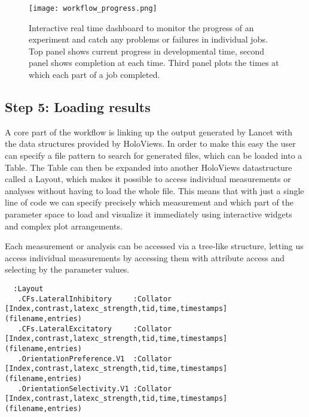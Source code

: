 \begin{figure}
	\centering
        \texttt{[image: workflow\_progress.png]}
	    \caption[Interactive dashboard to monitor workflow
          progress.]{Interactive real time dashboard to monitor the
          progress of an experiment and catch any problems or failures
          in individual jobs. Top panel shows current progress in
          developmental time, second panel shows completion at each
          time. Third panel plots the times at which each part of a
          job completed.}
	\label{workflow_progress}
\end{figure}


\subsection{Step 5: Loading results}

A core part of the workflow is linking up the output generated by
Lancet with the data structures provided by HoloViews. In order to
make this easy the user can specify a file pattern to search for
generated files, which can be loaded into a Table. The Table can then
be expanded into another HoloViews datastructure called a Layout,
which makes it possible to access individual measurements or analyses
without having to load the whole file. This means that with just a
single line of code we can specify precisely which measurement and
which part of the parameter space to load and visualize it immediately
using interactive widgets and complex plot arrangements.

Each measurement or analysis can be accessed via a tree-like
structure, letting us access individual measurements by accessing them
with attribute access and selecting by the parameter values.

\begin{minipage}{\linewidth}
\begin{lstlisting}
  :Layout
   .CFs.LateralInhibitory     :Collator   [Index,contrast,latexc_strength,tid,time,timestamps]   (filename,entries)
   .CFs.LateralExcitatory     :Collator   [Index,contrast,latexc_strength,tid,time,timestamps]   (filename,entries)
   .OrientationPreference.V1  :Collator   [Index,contrast,latexc_strength,tid,time,timestamps]   (filename,entries)
   .OrientationSelectivity.V1 :Collator   [Index,contrast,latexc_strength,tid,time,timestamps]   (filename,entries)
\end{lstlisting}
\end{minipage}


